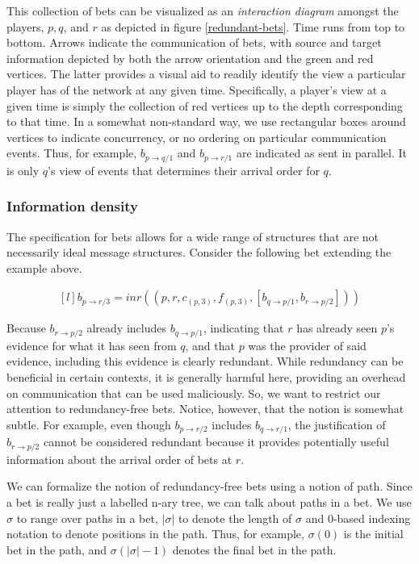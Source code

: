\documentclass[]{acm_proc_article-sp}
\numberwithin{equation}{subsection}
\begin{document}
This collection of bets can be visualized as an \emph{interaction
  diagram} amongst the players, $p,q$, and $r$ as depicted in figure
\ref{redundant-bets}. Time runs from top to bottom. Arrows indicate
the communication of bets, with source and target information depicted
by both the arrow orientation and the green and red vertices. The
latter provides a visual aid to readily identify the view a particular
player has of the network at any given time. Specifically, a player's
view at a given time is simply the collection of red vertices up to
the depth corresponding to that time. In a somewhat non-standard way,
we use rectangular boxes around vertices to indicate concurrency, or
no ordering on particular communication events. Thus, for example,
$b_{p \to q/1}$ and $b_{p \to r/1}$ are indicated as sent in parallel. It
is only $q$'s view of events that determines their arrival order for
$q$.

\subsubsection{Information density}

The specification for bets allows for a wide range of structures that
are not necessarily ideal message structures. Consider the following
bet extending the example above.

\begin{equation*}
  \begin{aligned}[l]
    b_{p \to r/3} = inr( ( p, r, c_{(p,3)}, f_{(p,3)}, [b_{q \to p/1},b_{r \to p/2}] ) )
  \end{aligned}
\end{equation*}

Because $b_{r \to p/2}$ already includes $b_{q \to p/1}$, indicating
that $r$ has already seen $p$'s evidence for what it has seen from
$q$, and that $p$ was the provider of said evidence, including this
evidence is clearly redundant. While redundancy can be beneficial in
certain contexts, it is generally harmful here, providing an overhead
on communication that can be used maliciously. So, we want to restrict
our attention to redundancy-free bets. Notice, however, that the
notion is somewhat subtle. For example, even though $b_{p \to r /2}$
includes $b_{q \to r/1}$, the justification of $b_{r \to p/2}$ cannot be
considered redundant because it provides potentially useful
information about the arrival order of bets at $r$.

We can formalize the notion of redundancy-free bets using a notion of
path. Since a bet is really just a labelled n-ary tree, we can talk
about paths in a bet. We use $\sigma$ to range over paths in a bet,
$|\sigma|$ to denote the length of $\sigma$ and 0-based indexing
notation to denote positions in the path. Thus, for example,
$\sigma(0)$ is the initial bet in the path, and $\sigma( |\sigma| -
1)$ denotes the final bet in the path.
\end{document}
